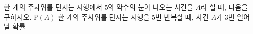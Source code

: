 한 개의 주사위를 던지는 시행에서 $5$의 약수의 눈이 나오는 사건을 $A$라 할 때, 다음을 구하시오.
 $\mathrm{P}(A)$
 한 개의 주사위를 던지는 시행을 $5$번 반복할 때, 사건 $A$가 $3$번 일어날 확률
